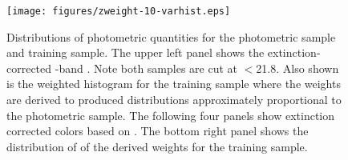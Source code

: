\documentclass{emulateapj}
\newcommand{\rmax}{21.8}
\begin{document}

\begin{figure}[p] \centering
    \texttt{[image: figures/zweight-10-varhist.eps]}

    \caption{Distributions of photometric quantities for the photometric sample
    and training sample.  The upper left panel shows the extinction-corrected
    \rmag-band \cmodelmag.  Note both samples are cut at \rmag$ < $\rmax.  
    Also shown is the weighted histogram for the training sample where
    the weights are derived to produced distributions approximately 
    proportional to the photometric sample.
    The following four panels show extinction corrected colors based on
    \modelmag.  The bottom right panel shows the distribution of of the
    derived weights for the training sample. }
    \label{fig:varhist}

    \vspace{2em}
\end{figure}
\end{document}
